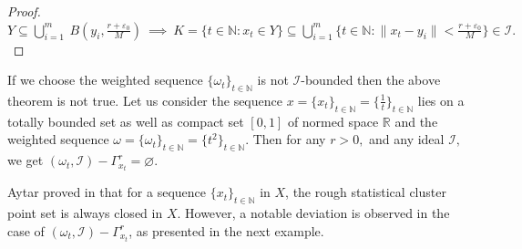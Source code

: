 \documentclass[reqno]{amsart}
\begin{document}
{\begin{proof}
	$Y\subseteq \displaystyle{\bigcup_{i=1}^m} ~ B(y_i, \frac{r+\varepsilon_{0}}{M})~\implies ~ K=\{t\in \mathbb{N}:x_t\in Y\} \subseteq \displaystyle{\bigcup_{i=1}^m} \{t\in \mathbb{N}: \|x_t-y_i\|<\frac{r+\varepsilon_{0}}{M}\}\in \mathcal{I}.$ \end{proof}

\begin{remark} If we choose the weighted sequence  $\{\omega_t\}_{t\in\mathbb{N}}$ is not $\mathcal{I}$-bounded then the above theorem is not true. Let us consider the sequence $x=\{x_{t}\}_{t\in \mathbb{N}}=\{\frac{1}{t}\}_{t\in \mathbb{N}}$ lies on a totally bounded set as well as compact set $[0,1]$ of normed space $\mathbb{R}$ and the weighted sequence $\omega=\{\omega_t\}_{t\in\mathbb{N}}=\{t^2\}_{t\in \mathbb{N}}.$  
	Then  for any $r>0,$ and any ideal $\mathcal{I},$ we get $(\omega_t,\mathcal{I})-\Gamma_{x_t}^r=\varnothing.$
\end{remark}




Aytar proved in \cite[Theorem 2.2]{aytar2017rough} that  for a sequence $\{x_t\}_{t\in\mathbb{N}}$ in $X$, the rough statistical cluster point set is always closed in $X$. However, a notable deviation is observed in the case of $(\omega_t,\mathcal{I}) - \Gamma_{x_t}^r$, as presented in the next example.




}
\end{document}
